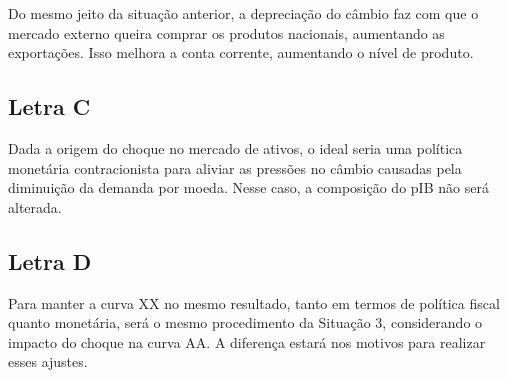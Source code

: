\documentclass[a4paper,12pt]{article}[abntex2]
\begin{document}
Do mesmo jeito da situação anterior, a depreciação do câmbio faz com que o mercado externo queira comprar os produtos nacionais, aumentando as exportações. Isso melhora a conta corrente, aumentando o nível de produto.

\subsection{\textbf{Letra C}}

Dada a origem do choque no mercado de ativos, o ideal seria uma política monetária contracionista
para aliviar as pressões no câmbio causadas pela diminuição da demanda por moeda. Nesse caso, a composição do pIB não será alterada.

\subsection{\textbf{Letra D}}
Para manter a curva XX no mesmo resultado, tanto em termos de política fiscal quanto monetária, será o mesmo procedimento da Situação 3, considerando o impacto do choque na curva AA. A diferença estará nos motivos para realizar esses ajustes.
\end{document}
